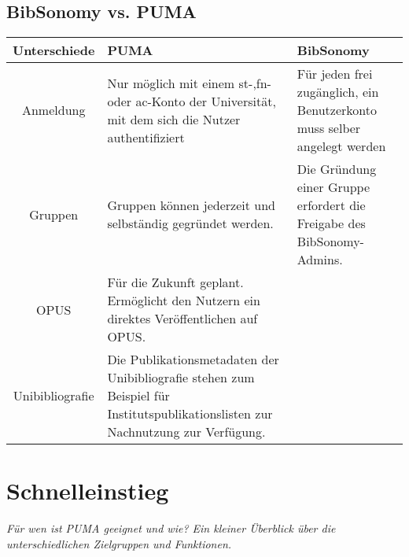 \documentclass[b5paper,11pt,twoside]{scrbook} %
\begin{document}
\subsection{BibSonomy vs. PUMA}
\small
\begin{longtable}{|c|m{4cm}|m{4cm}|}\hline
	\bfseries Unterschiede & \bfseries PUMA & \bfseries BibSonomy\\ \hline
	Anmeldung& Nur möglich mit einem st-,fn- oder ac-Konto der Universität, mit dem sich die Nutzer authentifiziert  & Für jeden frei zugänglich, ein Benutzerkonto muss selber angelegt werden \\ \hline
	 Gruppen\index{Gruppen} & Gruppen können jederzeit und selbständig gegründet werden. & Die Gründung einer Gruppe erfordert die Freigabe des BibSonomy-Admins. \\ \hline
	OPUS\index{OPUS} & Für die Zukunft geplant. Ermöglicht den Nutzern ein direktes Veröffentlichen auf OPUS. & \\ \hline
	Unibibliografie\index{Unibibliografie}& Die Publikationsmetadaten der Unibibliografie stehen zum Beispiel für Institutspublikationslisten zur Nachnutzung zur Verfügung.&\\ \hline
\end{longtable}
\normalsize
\newpage
\section{Schnelleinstieg}
\textit{Für wen ist PUMA geeignet und wie? Ein kleiner Überblick über die unterschiedlichen Zielgruppen und Funktionen.}
\end{document}
